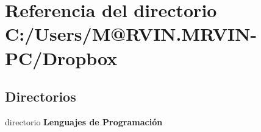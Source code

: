 \section{Referencia del directorio C\-:/\-Users/\-M@R\-V\-I\-N.\-M\-R\-V\-I\-N-\/\-P\-C/\-Dropbox}
\label{dir_7eb09e58583f359e753ec9733cdd3f32}
\subsection*{Directorios}
\begin{DoxyCompactItemize}
\item 
directorio {\bf Lenguajes de Programación}
\end{DoxyCompactItemize}
